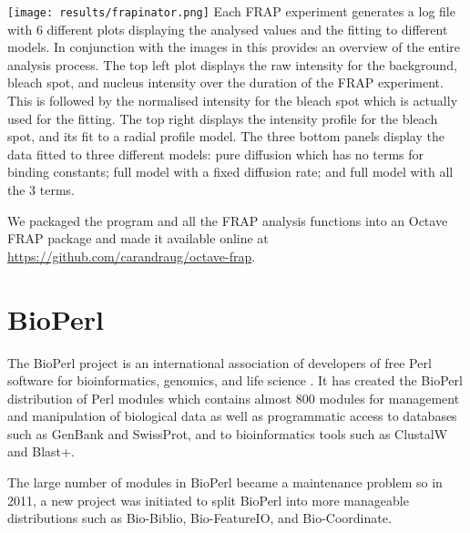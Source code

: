 \begin{sidewaysfigure}
  \texttt{[image: results/frapinator.png]}
               {Each FRAP experiment generates a log file with 6
                 different plots displaying the analysed values and
                 the fitting to different models.  In conjunction with
                 the images in  this
                 provides an overview of the entire analysis
                 process.  The top left plot displays the raw
                 intensity for the background, bleach spot, and
                 nucleus intensity over the duration of the FRAP
                 experiment. This is followed by the normalised
                 intensity for the bleach spot which is actually used
                 for the fitting. The top right displays the intensity
                 profile for the bleach spot, and its fit to a radial
                 profile model. The three bottom panels display the
                 data fitted to three different models: pure diffusion
                 which has no terms for binding constants; full model
                 with a fixed diffusion rate; and full model with all
                 the 3 terms.  }
               \label{fig:software:frapinator}
\end{sidewaysfigure}

We packaged the  program and all the FRAP analysis
functions into an Octave FRAP package and made it available
online at \url{https://github.com/carandraug/octave-frap}.

\section{BioPerl}

The BioPerl project is an international association of developers of
free Perl software for bioinformatics, genomics, and life science
\citep{bioperl}.  It has created the BioPerl distribution of Perl
modules which contains almost 800 modules for management and manipulation
of biological data as well as programmatic access to databases such as GenBank
and SwissProt, and to bioinformatics tools such as ClustalW and Blast+.


The large number of modules in BioPerl became a maintenance problem
so in 2011, a new project was initiated to split BioPerl into
more manageable distributions such as Bio-Biblio, Bio-FeatureIO, and
Bio-Coordinate.

